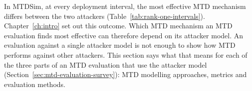 \documentclass{cshonours}
\begin{document}
In MTDSim, at every deployment interval, the most effective MTD mechanism
differs between the two attackers (Table~\ref{tab:rank-one-intervals}).
Chapter~\ref{ch:intro} set out this outcome. Which
MTD mechanism an MTD evaluation finds most effective can therefore depend on its
attacker model. An evaluation against a single attacker model is not enough
to show how MTD performs against other attackers.
This section says what that means for each of the three parts of
an MTD evaluation that use the attacker model
(Section~\ref{sec:mtd-evaluation-survey}): MTD modelling approaches, metrics and
evaluation methods.
\end{document}
